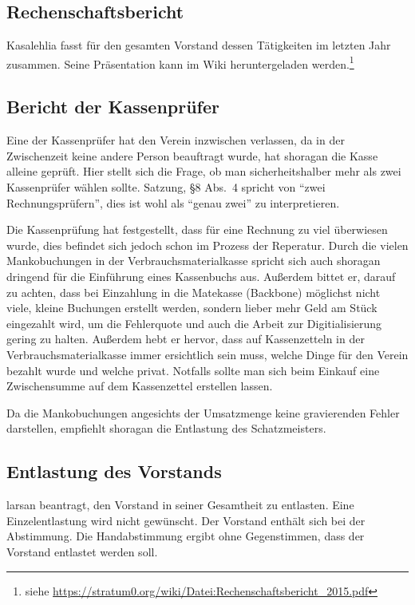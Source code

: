 \documentclass[a4paper,12pt]{scrartcl}
\begin{document}


\subsection{Rechenschaftsbericht}
Kasalehlia fasst für den gesamten Vorstand dessen Tätigkeiten im letzten Jahr
zusammen. Seine Präsentation kann im Wiki heruntergeladen
werden.\footnote{siehe
\url{https://stratum0.org/wiki/Datei:Rechenschaftsbericht_2015.pdf}}

\subsection{Bericht der Kassenprüfer}
Eine der Kassenprüfer hat den Verein inzwischen verlassen, da in der
Zwischenzeit keine andere Person beauftragt wurde, hat shoragan die Kasse
alleine geprüft. Hier stellt sich die Frage, ob man sicherheitshalber mehr als
zwei Kassenprüfer wählen sollte. Satzung, §8 Abs.~4 spricht von "`zwei
Rechnungsprüfern"', dies ist wohl als "`genau zwei"' zu interpretieren.

Die Kassenprüfung hat festgestellt, dass für eine Rechnung zu viel überwiesen
wurde, dies befindet sich jedoch schon im Prozess der Reperatur. Durch die
vielen Mankobuchungen in der Verbrauchsmaterialkasse spricht sich auch shoragan
dringend für die Einführung eines Kassenbuchs aus. Außerdem bittet er, darauf zu
achten, dass bei Einzahlung in die Matekasse (Backbone) möglichst nicht viele, kleine
Buchungen erstellt werden, sondern lieber mehr Geld am Stück eingezahlt wird, um
die Fehlerquote und auch die Arbeit zur Digitialisierung gering zu halten.
Außerdem hebt er hervor, dass auf Kassenzetteln in der Verbrauchsmaterialkasse
immer ersichtlich sein muss,
welche Dinge für den Verein bezahlt wurde und welche privat. Notfalls sollte man
sich beim Einkauf eine Zwischensumme auf dem Kassenzettel erstellen lassen.

Da die Mankobuchungen angesichts der Umsatzmenge keine gravierenden Fehler
darstellen, empfiehlt shoragan die Entlastung des Schatzmeisters.

\subsection{Entlastung des Vorstands}
larsan beantragt, den Vorstand in seiner Gesamtheit zu entlasten. Eine
Einzelentlastung wird nicht gewünscht. Der Vorstand enthält sich bei der
Abstimmung. Die Handabstimmung ergibt ohne Gegenstimmen, dass der Vorstand
entlastet werden soll.
\end{document}
